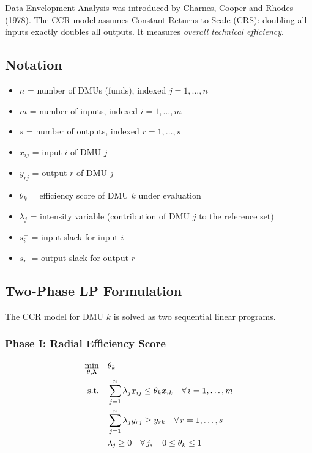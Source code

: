 \documentclass[12pt,a4paper]{article}
\begin{document}
Data Envelopment Analysis was introduced by Charnes, Cooper and Rhodes (1978).
The CCR model assumes Constant Returns to Scale (CRS): doubling all inputs exactly
doubles all outputs.  It measures \emph{overall technical efficiency}.

\subsection{Notation}

\begin{itemize}
    \item $n$ = number of DMUs (funds), indexed $j = 1, \ldots, n$
    \item $m$ = number of inputs, indexed $i = 1, \ldots, m$
    \item $s$ = number of outputs, indexed $r = 1, \ldots, s$
    \item $x_{ij}$ = input $i$ of DMU $j$
    \item $y_{rj}$ = output $r$ of DMU $j$
    \item $\theta_k$ = efficiency score of DMU $k$ under evaluation
    \item $\lambda_j$ = intensity variable (contribution of DMU $j$ to the reference set)
    \item $s^-_i$ = input slack for input $i$
    \item $s^+_r$ = output slack for output $r$
\end{itemize}

\subsection{Two-Phase LP Formulation}

The CCR model for DMU $k$ is solved as two sequential linear programs.

\subsubsection*{Phase I: Radial Efficiency Score}

\begin{align}
    \min_{\theta, \boldsymbol{\lambda}} \quad & \theta_k \label{eq:p1obj} \\
    \text{s.t.} \quad
    & \sum_{j=1}^{n} \lambda_j x_{ij} \leq \theta_k x_{ik}
      \quad \forall\, i = 1, \ldots, m \label{eq:p1in} \\
    & \sum_{j=1}^{n} \lambda_j y_{rj} \geq y_{rk}
      \quad \forall\, r = 1, \ldots, s \label{eq:p1out} \\
    & \lambda_j \geq 0 \quad \forall\, j, \quad 0 \leq \theta_k \leq 1 \notag
\end{align}
\end{document}
